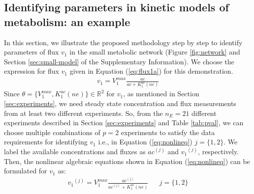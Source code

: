 \documentclass[10pt]{article}
\begin{document}
	\subsection{Identifying parameters in kinetic models of metabolism: an example}\label{sec:example}	
	In this section, we illustrate the proposed methodology step by step to identify parameters of flux $v_1$ in the small metabolic network (Figure \ref{fig:network} and Section \ref{sec:small-model} of the Supplementary Information). We choose the expression for flux $v_1$ given in Equation (\ref{eq:flux1a}) for this demonstration. 
	\begin{align}\tag{S5}
	v_1 = V_1^{max}\frac{ac}{ac+K_{1}^{ac}(ne)}
	\end{align}		
	Since $\theta = \{V_1^{max}, K_1^{ac} (ne)\} \in \mathbb{R}^2$ for $v_1$, as mentioned in Section \ref{sec:experiments}, we need steady state concentration and flux measurements from at least two different experiments. So, from the $n_E = 21$ different experiments described in Section \ref{sec:experiments} and Table \ref{tab:pval}, we can choose multiple combinations of $p = 2$ experiments to satisfy the data requirements for identifying $v_1$ i.e., in Equation (\ref{eq:nonlineq}) $j = \{1, 2\}$. We label the available concentrations and fluxes as ${ac}^{(j)}$ and ${v_1}^{(j)}$, respectively. Then, the nonlinear algebraic equations shown in Equation (\ref{eq:nonlineq}) can be formulated for $v_1$ as:
	\begin{align*}%
	{v_1}^{(j)} = V_{1}^{max}\frac{ac^{(j)}}{ac^{(j)}+K_{1}^{ac}(ne)} &&  j=\{1, 2\}
	\end{align*}
	
\end{document}
